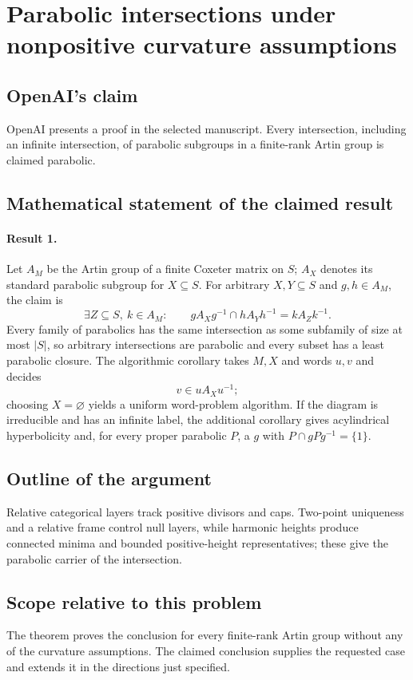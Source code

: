 \documentclass[11pt]{article}
\begin{document}
\section*{Parabolic intersections under nonpositive curvature assumptions}

\subsection{OpenAI's claim}
OpenAI presents a proof in the selected manuscript. Every intersection, including an infinite intersection, of parabolic subgroups in a finite-rank Artin group is claimed parabolic.

\subsection{Mathematical statement of the claimed result}
\paragraph{Result 1.} Let \(A_M\) be the Artin group of a finite Coxeter matrix on \(S\); \(A_X\) denotes its standard parabolic subgroup for \(X\subseteq S\). For arbitrary \(X,Y\subseteq S\) and \(g,h\in A_M\), the claim is
\[
 \exists Z\subseteq S,\ k\in A_M:\qquad
 gA_Xg^{-1}\cap hA_Yh^{-1}=kA_Zk^{-1}.
\]
Every family of parabolics has the same intersection as some subfamily of size at most \(|S|\), so arbitrary intersections are parabolic and every subset has a least parabolic closure. The algorithmic corollary takes \(M,X\) and words \(u,v\) and decides
\[
 v\in uA_Xu^{-1};
\]
choosing \(X=\varnothing\) yields a uniform word-problem algorithm. If the diagram is irreducible and has an infinite label, the additional corollary gives acylindrical hyperbolicity and, for every proper parabolic \(P\), a \(g\) with \(P\cap gPg^{-1}=\{1\}\).

\subsection{Outline of the argument}
Relative categorical layers track positive divisors and caps. Two-point uniqueness and a relative frame control null layers, while harmonic heights produce connected minima and bounded positive-height representatives; these give the parabolic carrier of the intersection.

\subsection{Scope relative to this problem}
The theorem proves the conclusion for every finite-rank Artin group without any of the curvature assumptions. The claimed conclusion supplies the requested case and extends it in the directions just specified.
\end{document}
